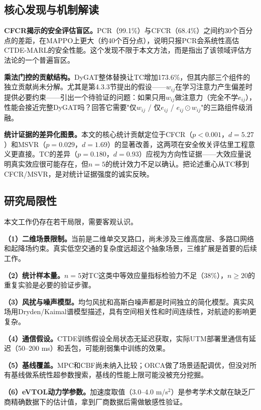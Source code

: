 \documentclass[12pt,a4paper,UTF8]{ctexart}
\begin{document}
\subsection{核心发现与机制解读}

\textbf{CFCR揭示的安全评估盲区。}PCR（99.1\%）与CFCR（68.4\%）之间约30个百分点的差距，在MAPPO上更大（约40个百分点），说明只报PCR会系统性高估CTDE-MARL的安全性能。这个发现不限于本文方法，而是指出了该领域评估方法论的一个普遍盲区。

\textbf{乘法门控的贡献结构。}DyGAT整体替换让TC增加173.6\%，但其内部三个组件的独立贡献尚未分解。尤其是第4.3.3节提出的假设——$w_{ij}$在学习注意力产生偏差时提供必要约束——引出一个待验证的问题：如果只用$w_{ij}$做注意力（完全不学$e_{ij}$），性能会接近完整DyGAT吗？回答它需要"仅$w_{ij}$ / 仅$e_{ij}$ / $e_{ij}\odot w_{ij}$"的三路组件级消融。

\textbf{统计证据的差异化图景。}本文的核心统计贡献定位于CFCR（$p<0.001$，$d=5.27$）和MSVR（$p=0.029$，$d=1.69$）的显著改善，这两项在安全攸关评估里工程意义更直接。TC的差异（$p=0.180$，$d=0.93$）应视为方向性证据——大效应量说明真实效应很可能存在，但$n=5$的统计效力不足以确认。把论述重心从TC移到CFCR/MSVR，是对统计证据强度的诚实反映。

\subsection{研究局限性}

本文工作仍存在若干局限，需要客观认识。

\textbf{（1）二维场景限制。}当前是二维单交叉路口，尚未涉及三维高度层、多路口网络和起降场约束。真实低空交通的复杂度远超这个抽象场景，三维扩展是首要的后续工作。

\textbf{（2）统计样本量。}$n=5$对TC这类中等效应量指标检验力不足（38\%），$n\geq20$的重复实验是必要的验证步骤。

\textbf{（3）风扰与噪声模型。}均匀风扰和高斯白噪声都是时间独立的简化模型。真实风场用Dryden/Kaimal谱模型描述，具有空间相关性和时间连续性，对航迹的影响更复杂。

\textbf{（4）通信假设。}CTDE训练假设全局状态无延迟获取，实际UTM部署里通信有延迟（50--200 ms）和丢包，可能削弱集中训练的效果。

\textbf{（5）基线覆盖。}MPC和CBF尚未纳入比较；ORCA做了场景适配调优，但没对所有基线做系统性超参数搜索，基线的性能上限可能没被充分挖掘。

\textbf{（6）eVTOL动力学参数。}加速度取值（3.0--4.0 m/s$^2$）是参考学术文献\cite{ref25}在缺乏厂商精确数据下的估计值，拿到厂商数据后需做敏感性验证。
\end{document}
